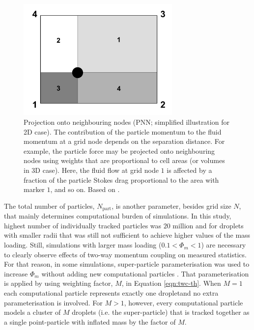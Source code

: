 \documentclass{pracamgren}
\begin{document}
\begin{figure}[h]
\centering
\includegraphics[width=8cm]{figures/1-03_pnn.pdf}
\caption{
Projection onto neighbouring nodes (PNN; simplified illustration for 2D case).
The contribution of the particle momentum to the fluid momentum at a grid node depends on the separation distance.
For example, the particle force may be projected onto neighbouring nodes using weights that are proportional to cell areas (or volumes in 3D case).
Here, the fluid flow at grid node $1$ is affected by a fraction of the particle Stokes drag proportional to the area with marker $1$, and so on.
Based on \textcite[Fig. 1 therein]{Garg2007}.}
\label{fig:pnn}
\end{figure}

\medskip

The total number of particles, $N_{\text{part}}$, is another parameter, besides grid size $N$, that mainly determines computational burden of simulations.
In this study, highest number of individually tracked particles was $20$ million and for droplets with smaller radii that was still not sufficient to achieve higher values of the mass loading.
Still, simulations with larger mass loading ($0.1 < \Phi_{m} < 1$) are necessary to clearly observe effects of two-way momentum coupling on measured statistics.
For that reason, in some simulations, super-particle parameterisation was used to increase $\Phi_m$ without adding new computational particles \parencite{Elghobashi1994}.
That parameterisation is applied by using weighting factor, $M$, in Equation \ref{eqn:twc-th}.
When $M=1$ each computational particle represents exactly one dropletand no extra parameterisation is involved.
For $M > 1$, however, every computational particle models a cluster of $M$ droplets (i.e. the super-particle) that is tracked together as a single point-particle with inflated mass by the factor of $M$.
\end{document}
